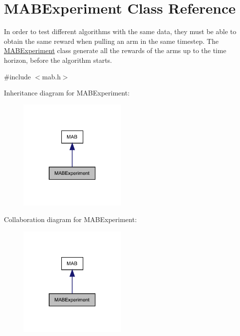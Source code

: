 \hypertarget{class_m_a_b_experiment}{}\section{M\+A\+B\+Experiment Class Reference}
\label{class_m_a_b_experiment}


In order to test different algorithms with the same data, they must be able to obtain the same reward when pulling an arm in the same timestep. The \mbox{\hyperlink{class_m_a_b_experiment}{M\+A\+B\+Experiment}} class generate all the rewards of the arms up to the time horizon, before the algorithm starts.  




{\ttfamily \#include $<$mab.\+h$>$}



Inheritance diagram for M\+A\+B\+Experiment\+:
\nopagebreak
\begin{figure}[H]
\begin{center}
\leavevmode
\includegraphics[width=151pt]{class_m_a_b_experiment__inherit__graph}
\end{center}
\end{figure}


Collaboration diagram for M\+A\+B\+Experiment\+:
\nopagebreak
\begin{figure}[H]
\begin{center}
\leavevmode
\includegraphics[width=151pt]{class_m_a_b_experiment__coll__graph}
\end{center}
\end{figure}
